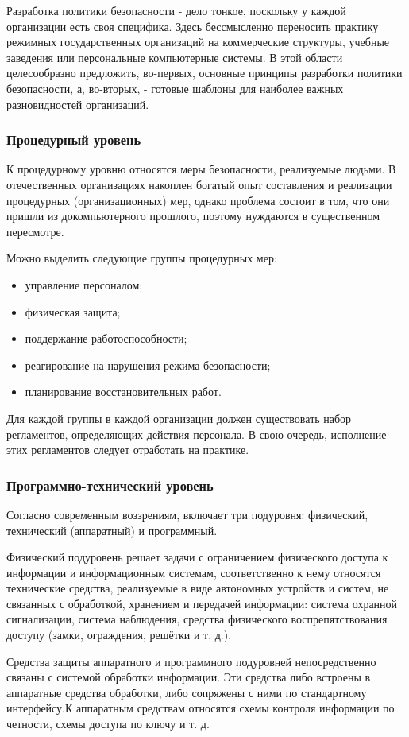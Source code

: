 Разработка политики безопасности - дело тонкое, поскольку у каждой
организации есть своя специфика. Здесь бессмысленно переносить практику
режимных государственных организаций на коммерческие структуры, учебные
заведения или персональные компьютерные системы. В этой области целесообразно
предложить, во-первых, основные принципы разработки политики безопасности, а,
во-вторых, - готовые шаблоны для наиболее важных разновидностей организаций.
\subsubsection{Процедурный уровень}
К процедурному уровню относятся меры безопасности, реализуемые людьми. В
отечественных организациях накоплен богатый опыт составления и реализации
процедурных (организационных) мер, однако проблема состоит в том, что они
пришли из докомпьютерного прошлого, поэтому нуждаются в существенном
пересмотре.

\noindent Можно выделить следующие группы процедурных мер:
\begin{itemize}
 \item управление персоналом;%
 \item физическая защита;%
 \item поддержание работоспособности;%
 \item реагирование на нарушения режима безопасности;%
 \item планирование восстановительных работ.%
\end{itemize}
Для каждой группы в каждой организации должен существовать набор регламентов,
определяющих действия персонала. В свою очередь, исполнение этих регламентов
следует отработать на практике.
\subsubsection{Программно-технический уровень}
Согласно современным воззрениям, включает три подуровня: физический,
технический (аппаратный) и программный.

Физический подуровень решает задачи с ограничением физического доступа к
информации и информационным системам, соответственно к нему относятся
технические средства, реализуемые в виде автономных устройств и систем, не
связанных с обработкой, хранением и передачей информации: система охранной
сигнализации, система наблюдения, средства физического воспрепятствования
доступу (замки, ограждения, решётки и т. д.).

Средства защиты аппаратного и программного подуровней непосредственно связаны
с системой обработки информации. Эти средства либо встроены в аппаратные
средства обработки, либо сопряжены с ними по стандартному интерфейсу.К
аппаратным средствам относятся схемы контроля информации по четности, схемы
доступа по ключу и т. д.

